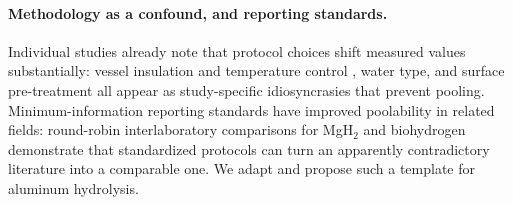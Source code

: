 \paragraph{Methodology as a confound, and reporting standards.}
Individual studies already note that protocol choices shift measured values substantially:
vessel insulation and temperature control \citep{urbonavicius2023}, water type, and
surface pre-treatment \citep{wen2018} all appear as study-specific idiosyncrasies that
prevent pooling. Minimum-information reporting standards have improved poolability in
related fields: round-robin interlaboratory comparisons for MgH$_2$
\citep{wulf2021} and biohydrogen \citep{hoque2018} demonstrate that standardized
protocols can turn an apparently contradictory literature into a comparable one. We adapt
and propose such a template for aluminum hydrolysis.

